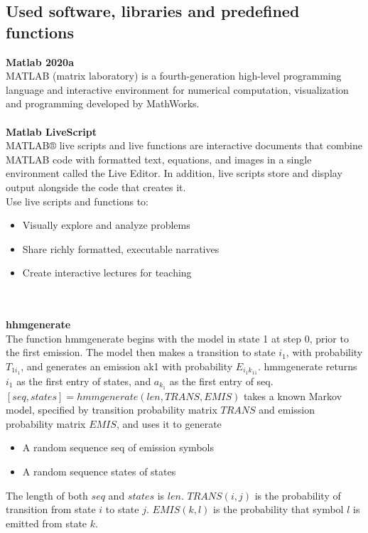 \subsection{Used software, libraries and predefined functions} \label{subsec:libraries}
\textbf{Matlab 2020a}\\
MATLAB (matrix laboratory) is a fourth-generation high-level programming language and interactive environment for numerical
computation, visualization and programming developed by MathWorks.\\
\\
\textbf{Matlab LiveScript}~\cite{livescript}\\
MATLAB® live scripts and live functions are interactive documents that combine MATLAB code with formatted text, equations,
and images in a single environment called the Live Editor.
In addition, live scripts store and display output alongside the code that creates it.\\
Use live scripts and functions to:\\
\begin{itemize}
    \item Visually explore and analyze problems
    \item Share richly formatted, executable narratives
    \item Create interactive lectures for teaching
\end{itemize}\\
\\
\textbf{hhmgenerate}~\cite{hhmgenerate}\\
The function hmmgenerate begins with the model in state 1 at step 0, prior to the first emission.
The model then makes a transition to state $i_1$, with probability $T_{1i_1}$, and generates an emission ak1 with probability $E_{i_1k_11}$.
hmmgenerate returns $i_1$ as the first entry of states, and $a_k_1$ as the first entry of seq.
$[seq,states] = hmmgenerate(len,TRANS,EMIS)$ takes a known Markov model, specified by transition probability matrix $TRANS$ and emission probability matrix $EMIS$,
and uses it to generate
\begin{itemize}
    \item A random sequence seq of emission symbols
    \item A random sequence states of states
\end{itemize}
The length of both $seq$ and $states$ is $len$.
$TRANS(i,j)$ is the probability of transition from state $i$ to state $j$.
$EMIS(k,l)$ is the probability that symbol $l$ is emitted from state $k$.\\
